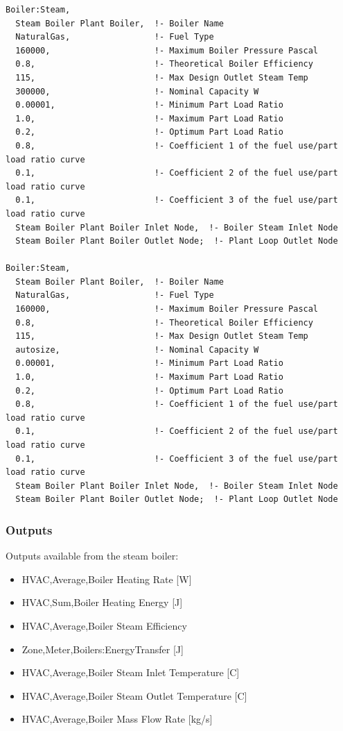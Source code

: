 \begin{lstlisting}
Boiler:Steam,
  Steam Boiler Plant Boiler,  !- Boiler Name
  NaturalGas,                 !- Fuel Type
  160000,                     !- Maximum Boiler Pressure Pascal
  0.8,                        !- Theoretical Boiler Efficiency
  115,                        !- Max Design Outlet Steam Temp
  300000,                     !- Nominal Capacity W
  0.00001,                    !- Minimum Part Load Ratio
  1.0,                        !- Maximum Part Load Ratio
  0.2,                        !- Optimum Part Load Ratio
  0.8,                        !- Coefficient 1 of the fuel use/part load ratio curve
  0.1,                        !- Coefficient 2 of the fuel use/part load ratio curve
  0.1,                        !- Coefficient 3 of the fuel use/part load ratio curve
  Steam Boiler Plant Boiler Inlet Node,  !- Boiler Steam Inlet Node
  Steam Boiler Plant Boiler Outlet Node;  !- Plant Loop Outlet Node

Boiler:Steam,
  Steam Boiler Plant Boiler,  !- Boiler Name
  NaturalGas,                 !- Fuel Type
  160000,                     !- Maximum Boiler Pressure Pascal
  0.8,                        !- Theoretical Boiler Efficiency
  115,                        !- Max Design Outlet Steam Temp
  autosize,                   !- Nominal Capacity W
  0.00001,                    !- Minimum Part Load Ratio
  1.0,                        !- Maximum Part Load Ratio
  0.2,                        !- Optimum Part Load Ratio
  0.8,                        !- Coefficient 1 of the fuel use/part load ratio curve
  0.1,                        !- Coefficient 2 of the fuel use/part load ratio curve
  0.1,                        !- Coefficient 3 of the fuel use/part load ratio curve
  Steam Boiler Plant Boiler Inlet Node,  !- Boiler Steam Inlet Node
  Steam Boiler Plant Boiler Outlet Node;  !- Plant Loop Outlet Node
\end{lstlisting}

\subsubsection{Outputs}\label{outputs-11-004}

Outputs available from the steam boiler:

\begin{itemize}
    \item
    HVAC,Average,Boiler Heating Rate {[}W{]}
    \item
    HVAC,Sum,Boiler Heating Energy {[}J{]}
    \item
    HVAC,Average,Boiler Steam Efficiency
    \item
    Zone,Meter,Boilers:EnergyTransfer {[}J{]}
    \item
    HVAC,Average,Boiler Steam Inlet Temperature {[}C{]}
    \item
    HVAC,Average,Boiler Steam Outlet Temperature {[}C{]}
    \item
    HVAC,Average,Boiler Mass Flow Rate {[}kg/s{]}
\end{itemize}


